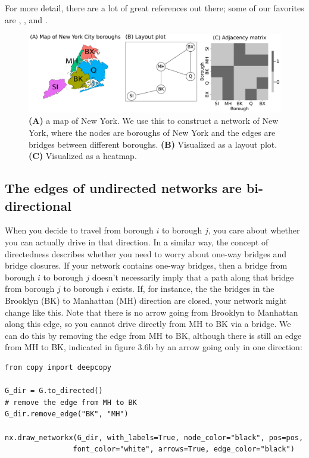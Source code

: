 For more detail, there are a lot of great references out there; some of our favorites are \cite{Barabsi2013Mar}, \cite{Gross2005Sep}, and \cite{Newman2006Jun}.

\begin{figure}
    \centering
    \includegraphics[width=\linewidth]{representations/ch4/Images/nyc_ex.png}
    \caption[New York City borough example]{\textbf{(A)} a map of New York. We use this to construct a network of New York, where the nodes are boroughs of New York and the edges are bridges between different boroughs. \textbf{(B)} Visualized as a layout plot. \textbf{(C)} Visualized as a heatmap.}
    \label{fig:ch4:nyc_ex}
\end{figure}

\subsection{The edges of undirected networks are bi-directional}

When you decide to travel from borough $i$ to borough $j$, you care about whether you can {actually drive} in that direction. In a similar way, the concept of directedness describes whether you need to worry about one-way bridges and bridge closures. If your network contains one-way bridges, then a bridge from borough $i$ to borough $j$ doesn't {necessarily} imply that a path along that bridge from borough $j$ to borough $i$ exists. If, for instance, the the bridges in the Brooklyn (BK) to Manhattan (MH) direction are closed, your network might change like this. Note that there is no arrow going from Brooklyn to Manhattan along this edge, so you cannot drive directly from MH to BK via a bridge. We can do this by removing the edge from MH to BK, although there is still an edge from MH to BK, indicated in figure 3.6b by an arrow going only in one direction:

\begin{lstlisting}[style=python]
from copy import deepcopy

G_dir = G.to_directed()
# remove the edge from MH to BK
G_dir.remove_edge("BK", "MH")

nx.draw_networkx(G_dir, with_labels=True, node_color="black", pos=pos,
                font_color="white", arrows=True, edge_color="black")
\end{lstlisting}

